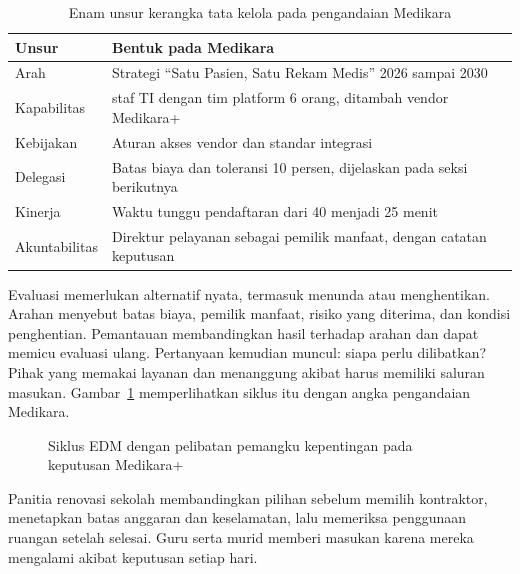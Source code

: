 \begin{table}[!htb]
  \centering\small
  \caption{Enam unsur kerangka tata kelola pada pengandaian Medikara}
  \label{tab:ch02-kerangka}
  \begin{tabularx}{\textwidth}{|>{\raggedright\arraybackslash}p{}|>{\raggedright\arraybackslash}X|}
    \hline
    \textbf{Unsur} & \textbf{Bentuk pada Medikara} \\ \hline
    Arah & Strategi ``Satu Pasien, Satu Rekam Medis'' 2026 sampai 2030 \\ \hline
    Kapabilitas & 52 staf TI dengan tim platform 6 orang, ditambah vendor Medikara+ \\
    \hline
    Kebijakan & Aturan akses vendor dan standar integrasi \\ \hline
    Delegasi & Batas biaya dan toleransi 10 persen, dijelaskan pada seksi berikutnya \\
    \hline
    Kinerja & Waktu tunggu pendaftaran dari 40 menjadi 25 menit \\ \hline
    Akuntabilitas & Direktur pelayanan sebagai pemilik manfaat, dengan catatan keputusan \\
    \hline
  \end{tabularx}
\end{table}

Evaluasi memerlukan alternatif nyata, termasuk menunda atau menghentikan. Arahan menyebut
batas biaya, pemilik manfaat, risiko yang diterima, dan kondisi penghentian. Pemantauan
membandingkan hasil terhadap arahan dan dapat memicu evaluasi ulang. Pertanyaan kemudian
muncul: siapa perlu dilibatkan? Pihak yang memakai layanan dan menanggung akibat harus
memiliki saluran masukan. Gambar~\ref{fig:ch02-alur} memperlihatkan siklus itu dengan angka
pengandaian Medikara.

\begin{figure}[!htb]
  \centering
  
  \caption{Siklus EDM dengan pelibatan pemangku kepentingan pada keputusan Medikara+}
  \label{fig:ch02-alur}
\end{figure}

Panitia renovasi sekolah membandingkan pilihan sebelum memilih kontraktor, menetapkan batas
anggaran dan keselamatan, lalu memeriksa penggunaan ruangan setelah selesai. Guru serta
murid memberi masukan karena mereka mengalami akibat keputusan setiap hari.

